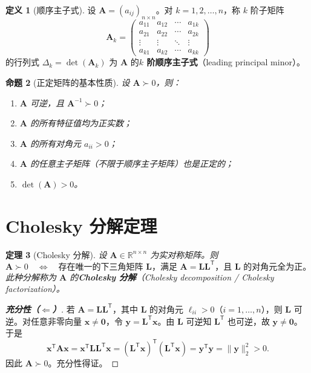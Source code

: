 \documentclass[12pt,a4paper]{article}
\theoremstyle{mystyle}
\newtheorem{theorem}{定理}[section]
\newtheorem{proposition}[theorem]{命题}
\theoremstyle{proofstyle}
\newtheorem*{proof}{证明}
\theoremstyle{definition}
\newtheorem{definition}[theorem]{定义}
\theoremstyle{remark}
\newcommand{\R}{\mathbb{R}}
\newcommand{\T}{^{\mathsf{T}}}
\newcommand{\x}{\mathbf{x}}
\newcommand{\y}{\mathbf{y}}
\newcommand{\A}{\mathbf{A}}
\newcommand{\Lmat}{\mathbf{L}}
\newcommand{\zero}{\mathbf{0}}
\begin{document}
\begin{definition}[顺序主子式]
设 $\A = (a_{ij})_{n\times n}$。对 $k = 1,2,\dots,n$，称 $k$ 阶子矩阵
\[
    \A_k = \begin{pmatrix}
        a_{11} & a_{12} & \cdots & a_{1k} \\
        a_{21} & a_{22} & \cdots & a_{2k} \\
        \vdots & \vdots & \ddots & \vdots \\
        a_{k1} & a_{k2} & \cdots & a_{kk}
    \end{pmatrix}
\]
的行列式 $\Delta_k = \det(\A_k)$ 为 $\A$ 的\textbf{$k$ 阶顺序主子式}（leading principal minor）。
\end{definition}

\begin{proposition}[正定矩阵的基本性质]\label{prop:basic}
设 $\A \succ 0$，则：
\begin{enumerate}
    \item $\A$ 可逆，且 $\A^{-1} \succ 0$；
    \item $\A$ 的所有特征值均为正实数；
    \item $\A$ 的所有对角元 $a_{ii} > 0$；
    \item $\A$ 的任意主子矩阵（不限于顺序主子矩阵）也是正定的；
    \item $\det(\A) > 0$。
\end{enumerate}
\end{proposition}

\section{Cholesky 分解定理}

\begin{theorem}[Cholesky 分解]\label{thm:cholesky}
设 $\A \in \R^{n\times n}$ 为实对称矩阵。则
\[
    \A \succ 0 \quad \Longleftrightarrow \quad
    \text{存在唯一的下三角矩阵 $\Lmat$，满足 $\A = \Lmat\Lmat\T$，且 $\Lmat$ 的对角元全为正。}
\]
此种分解称为 $\A$ 的\textbf{Cholesky 分解}（Cholesky decomposition / Cholesky factorization）。
\end{theorem}

\begin{proof}[\textbf{充分性（$\Longleftarrow$）}]

若 $\A = \Lmat\Lmat\T$，其中 $\Lmat$ 的对角元 $\ell_{ii} > 0$（$i=1,\dots,n$），则 $\Lmat$ 可逆。对任意非零向量 $\x \neq \zero$，令 $\y = \Lmat\T\x$。由 $\Lmat$ 可逆知 $\Lmat\T$ 也可逆，故 $\y \neq \zero$。于是
\[
    \x\T\A\x = \x\T\Lmat\Lmat\T\x = (\Lmat\T\x)\T(\Lmat\T\x) = \y\T\y = \|\y\|_2^2 > 0.
\]
因此 $\A \succ 0$。充分性得证。

\end{proof}
\end{document}
